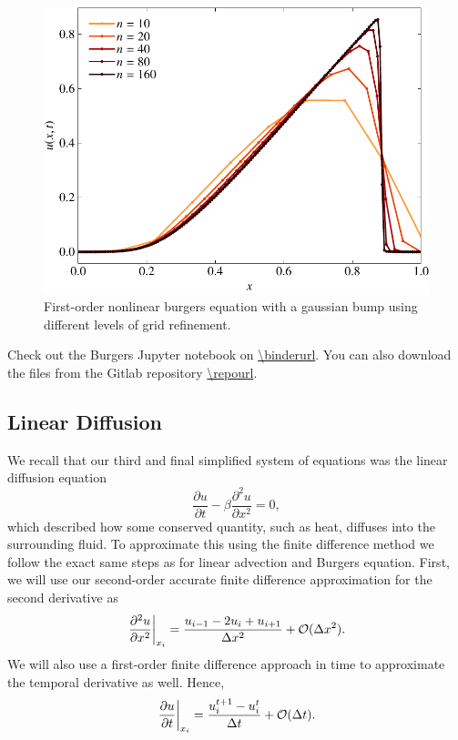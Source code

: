 \begin{figure}[htbp]
	\centering
	\includegraphics[width=0.65\linewidth]{Pictures/burgers_upwind}
	\caption{First-order nonlinear burgers equation with a gaussian bump using different levels of grid refinement.}
	\label{fig:burgers_upwind}
\end{figure}
\begin{jupyternote}
	Check out the Burgers Jupyter notebook on \url{\binderurl}. You can also download the files from the Gitlab repository \url{\repourl}.
\end{jupyternote}

\subsection{Linear Diffusion}
We recall that our third and final simplified system of equations was the linear diffusion equation
\begin{equation}
\frac{\partial u}{\partial t} - \beta \frac{\partial^2 u}{\partial x^2} = 0,
\end{equation}
which described how some conserved quantity, such as heat, diffuses into the surrounding fluid. To approximate this using the finite difference method we follow the exact same steps as for linear advection and Burgers equation. First, we will use our second-order accurate finite difference approximation for the second derivative as
\begin{equation}
	\left.\frac{\partial^2 u}{\partial x^2}\right\rvert_{x_i}^{} = \frac{u_{i-1} - 2u_i + u_{i+1}}{\Delta x^2} + \mathcal{O}(\Delta x^2).
\end{equation}
We will also use a first-order finite difference approach in time to approximate the temporal derivative as well. Hence,
\begin{equation}
	\left.\frac{\partial u}{\partial t}\right\rvert_{x_i}^{} = \frac{u_i^{t+1} - u_{i}^t}{\Delta t} + \mathcal{O}(\Delta t).
\end{equation}

